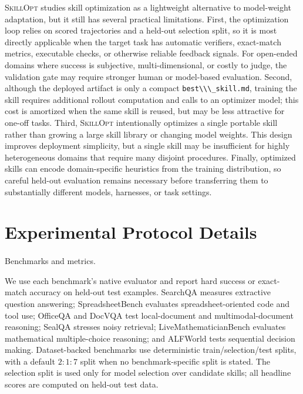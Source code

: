 \documentclass[
]{article}
\makeatletter
\let\oldparagraph\paragraph
\renewcommand{\paragraph}{
    \@ifstar
      \xxxParagraphStar
      \xxxParagraphNoStar
  }
\newcommand{\xxxParagraphStar}[1]{\oldparagraph*{#1}\mbox{}}
\newcommand{\xxxParagraphNoStar}[1]{\oldparagraph{#1}\mbox{}}
\newcommand{\passthrough}[1]{#1}
\newcommand{\ourmethod}{\textsc{SkillOpt}\xspace}
\makeatother
\begin{document}
\ourmethod{} studies skill optimization as a lightweight alternative to
model-weight adaptation, but it still has several practical limitations.
First, the optimization loop relies on scored trajectories and a
held-out selection split, so it is most directly applicable when the
target task has automatic verifiers, exact-match metrics, executable
checks, or otherwise reliable feedback signals. For open-ended domains
where success is subjective, multi-dimensional, or costly to judge, the
validation gate may require stronger human or model-based evaluation.
Second, although the deployed artifact is only a compact
\passthrough{\lstinline!best\\\_skill.md!}, training the skill requires
additional rollout computation and calls to an optimizer model; this
cost is amortized when the same skill is reused, but may be less
attractive for one-off tasks. Third, \ourmethod{} intentionally
optimizes a single portable skill rather than growing a large skill
library or changing model weights. This design improves deployment
simplicity, but a single skill may be insufficient for highly
heterogeneous domains that require many disjoint procedures. Finally,
optimized skills can encode domain-specific heuristics from the training
distribution, so careful held-out evaluation remains necessary before
transferring them to substantially different models, harnesses, or task
settings.

\section{Experimental Protocol
Details}\label{sec-app-experimental-setting}

\paragraph{Benchmarks and metrics.}\label{benchmarks-and-metrics.}

We use each benchmark's native evaluator and report hard success or
exact-match accuracy on held-out test examples. SearchQA measures
extractive question answering; SpreadsheetBench evaluates
spreadsheet-oriented code and tool use; OfficeQA and DocVQA test
local-document and multimodal-document reasoning; SealQA stresses noisy
retrieval; LiveMathematicianBench evaluates mathematical multiple-choice
reasoning; and ALFWorld tests sequential decision making. Dataset-backed
benchmarks use deterministic train/selection/test splits, with a default
\(2{:}1{:}7\) split when no benchmark-specific split is stated. The
selection split is used only for model selection over candidate skills;
all headline scores are computed on held-out test data.
\end{document}

